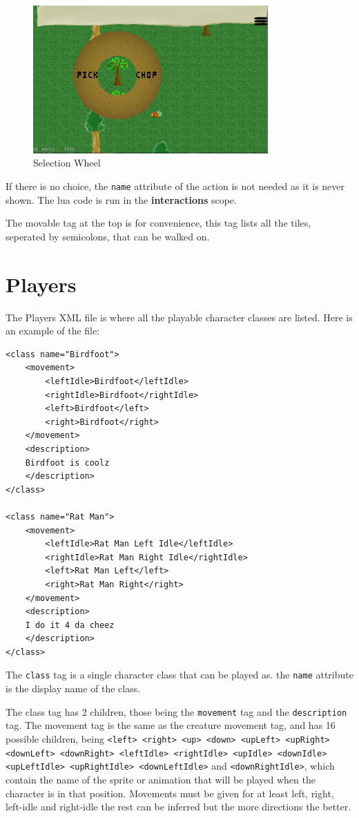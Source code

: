 \documentclass{book}
\begin{document}
\begin{figure}[ht!]
		\centering
		\includegraphics[width=90mm]{MultipleSelection.jpg}
		\caption{Selection Wheel}
\end{figure}

If there is no choice, the \texttt{name} attribute of the action is not needed as it is never shown. The lua code is run in the \textbf{interactions} scope.

The movable tag at the top is for convenience, this tag lists all the tiles, seperated by semicolons, that can be walked on.

\section{Players}
The Players XML file is where all the playable character classes are listed. Here is an example of the file:

\begin{verbatim}
<class name="Birdfoot">
	<movement>
		<leftIdle>Birdfoot</leftIdle>
		<rightIdle>Birdfoot</rightIdle>
		<left>Birdfoot</left>
		<right>Birdfoot</right>
	</movement>
	<description>
	Birdfoot is coolz
	</description>
</class>

<class name="Rat Man">
	<movement>
		<leftIdle>Rat Man Left Idle</leftIdle>
		<rightIdle>Rat Man Right Idle</rightIdle>
		<left>Rat Man Left</left>
		<right>Rat Man Right</right>
	</movement>
	<description>
	I do it 4 da cheez
	</description>
</class>
\end{verbatim}

The \texttt{class} tag is a single character class that can be played as. the \texttt{name} attribute is the display name of the class.

The class tag has 2 children, those being the \texttt{movement} tag and the \texttt{description} tag. The movement tag is the same as the creature movement tag, and has 16 possible children, being \texttt{<left> <right> <up> <down> <upLeft> <upRight> <downLeft> <downRight> <leftIdle> <rightIdle> <upIdle> <downIdle> <upLeftIdle> <upRightIdle> <downLeftIdle>} and \texttt{<downRightIdle>}, which contain the name of the sprite or animation that will be played when the character is in that position. Movements must be given for at least left, right, left-idle and right-idle the rest can be inferred but the more directions the better.
\end{document}
